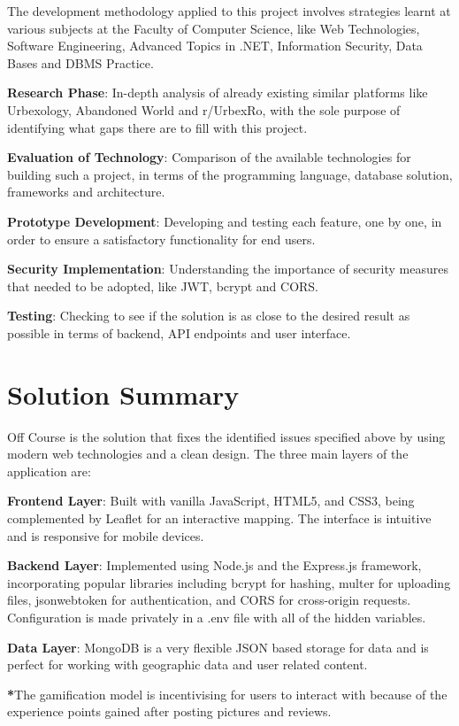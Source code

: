 \documentclass[12pt,a4paper]{report}
\begin{document}
The development methodology applied to this project involves strategies learnt at various subjects at the Faculty of Computer Science, like Web Technologies, Software Engineering, Advanced Topics in .NET, Information Security, Data Bases and DBMS Practice.

\textbf{Research Phase}: In-depth analysis of already existing similar platforms like Urbexology, Abandoned World and r/UrbexRo, with the sole purpose of identifying what gaps there are to fill with this project.

\textbf{Evaluation of Technology}: Comparison of the available technologies for building such a project, in terms of the programming language, database solution, frameworks and architecture.

\textbf{Prototype Development}: Developing and testing each feature, one by one, in order to ensure a satisfactory functionality for end users.

\textbf{Security Implementation}: Understanding the importance of security measures that needed to be adopted, like JWT, bcrypt and CORS.

\textbf{Testing}: Checking to see if the solution is as close to the desired result as possible in terms of backend, API endpoints and user interface.

\section*{Solution Summary}

Off Course is the solution that fixes the identified issues specified above by using modern web technologies and a clean design. The three main layers of the application are:

\textbf{Frontend Layer}: Built with vanilla JavaScript, HTML5, and CSS3, being complemented by Leaflet for an interactive mapping. The interface is intuitive and is responsive for mobile devices.

\textbf{Backend Layer}: Implemented using Node.js and the Express.js framework, incorporating popular libraries including bcrypt for hashing, multer for uploading files, jsonwebtoken for authentication, and CORS for cross-origin requests. Configuration is made privately in a .env file with all of the hidden variables.

\textbf{Data Layer}: MongoDB is a very flexible JSON based storage for data and is perfect for working with geographic data and user related content.

\textbf{*}The gamification model is incentivising for users to interact with because of the experience points gained after posting pictures and reviews.
\end{document}
